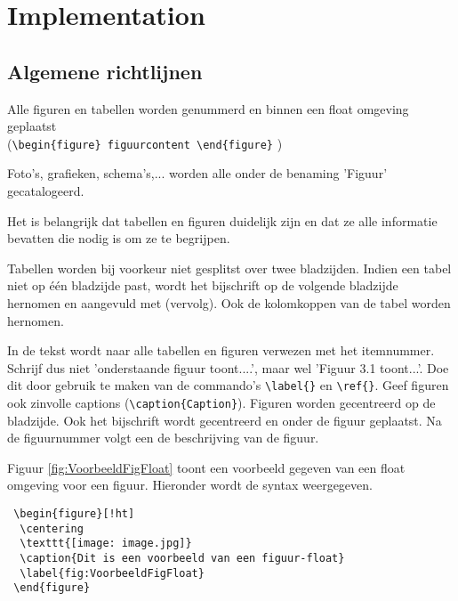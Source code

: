  
\chapter{Implementation}

\section{Algemene richtlijnen}

 Alle figuren en tabellen worden genummerd en binnen een float omgeving geplaatst \\ (\verb|\begin{figure} figuurcontent \end{figure}| )
 
 Foto's, grafieken, schema's,... worden alle onder de benaming 'Figuur' 
 gecatalogeerd. 
 
 Het is belangrijk dat tabellen en figuren duidelijk zijn en dat ze alle informatie bevatten die nodig is om ze te begrijpen. 
 
 Tabellen worden bij voorkeur niet gesplitst over twee bladzijden. Indien een tabel niet op \'e\'en bladzijde past, wordt het bijschrift op de volgende bladzijde hernomen en aangevuld met (vervolg). Ook de kolomkoppen van de tabel worden hernomen.
 
 In de tekst wordt naar alle tabellen en figuren verwezen met het itemnummer. Schrijf dus niet 'onderstaande figuur toont....', maar wel 'Figuur 3.1 toont...'. Doe dit door gebruik te maken van de commando's \verb|\label{}| en \verb|\ref{}|. Geef figuren ook zinvolle captions (\verb|\caption{Caption}|).
 Figuren worden gecentreerd op de bladzijde. Ook het bijschrift wordt gecentreerd en onder de figuur geplaatst. Na de figuurnummer volgt een de beschrijving van de figuur. 
 
 Figuur \ref{fig:VoorbeeldFigFloat} toont een voorbeeld gegeven van een float omgeving voor een figuur. Hieronder wordt de syntax weergegeven.


\verb| \begin{figure}[!ht] |\\
\verb|	\centering|\\
\verb|	\texttt{[image: image.jpg]}|\\
\verb|	\caption{Dit is een voorbeeld van een figuur-float}|\\
\verb|	\label{fig:VoorbeeldFigFloat}|\\
\verb| \end{figure}|

